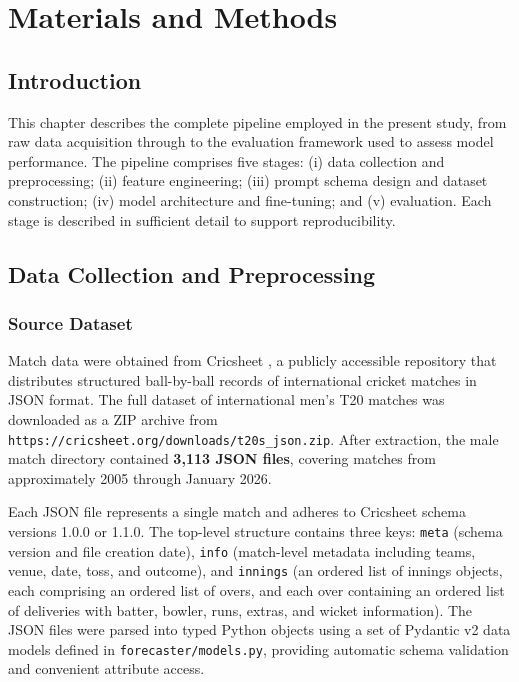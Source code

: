 \chapter{Materials and Methods}

\section{Introduction}

This chapter describes the complete pipeline employed in the present study, from raw data acquisition through to the evaluation framework used to assess model performance. The pipeline comprises five stages: (i) data collection and preprocessing; (ii) feature engineering; (iii) prompt schema design and dataset construction; (iv) model architecture and fine-tuning; and (v) evaluation. Each stage is described in sufficient detail to support reproducibility.

\section{Data Collection and Preprocessing}

\subsection{Source Dataset}

Match data were obtained from Cricsheet \cite{cricsheet}, a publicly accessible repository that distributes structured ball-by-ball records of international cricket matches in JSON format. The full dataset of international men's T20 matches was downloaded as a ZIP archive from \texttt{https://cricsheet.org/downloads/t20s\_json.zip}. After extraction, the male match directory contained \textbf{3,113 JSON files}, covering matches from approximately 2005 through January 2026.

Each JSON file represents a single match and adheres to Cricsheet schema versions 1.0.0 or 1.1.0. The top-level structure contains three keys: \texttt{meta} (schema version and file creation date), \texttt{info} (match-level metadata including teams, venue, date, toss, and outcome), and \texttt{innings} (an ordered list of innings objects, each comprising an ordered list of overs, and each over containing an ordered list of deliveries with batter, bowler, runs, extras, and wicket information). The JSON files were parsed into typed Python objects using a set of Pydantic v2 data models defined in \texttt{forecaster/models.py}, providing automatic schema validation and convenient attribute access.

